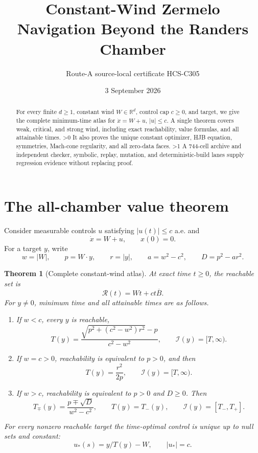 \documentclass[10pt]{article}
\title{Constant-Wind Zermelo Navigation Beyond the Randers Chamber}
\author{Route-A source-local certificate HCS-C305}
\date{3 September 2026}
\providecommand{\CRevisionRound}{2}
\newtheorem{theorem}{Theorem}
\newcommand{\R}{\mathbb R}
\newcommand{\B}{\overline B}
\begin{document}
\maketitle
\begin{abstract}
For every finite $d\ge1$, constant wind $W\in\R^d$, control cap $c\ge0$,
and target, we give the complete minimum-time atlas for
$\dot x=W+u$, $|u|\le c$. A single theorem covers weak, critical, and strong
wind, including exact reachability, value formulas, and all attainable times.
\ifnum\CRevisionRound>0
It also proves the unique constant optimizer, HJB equation, symmetries,
Mach-cone regularity, and all zero-data faces.
\fi
\ifnum\CRevisionRound>1
A 744-cell archive and independent checker, symbolic, replay, mutation, and
deterministic-build lanes supply regression evidence without replacing proof.
\fi
\end{abstract}

\section{The all-chamber value theorem}
Consider measurable controls $u$ satisfying $|u(t)|\le c$ a.e. and
\begin{equation}\label{eq:system}
 \dot x=W+u,\qquad x(0)=0.
\end{equation}
For a target $y$, write
\[
 w=|W|,\qquad p=W\cdot y,\qquad r=|y|,
 \qquad a=w^2-c^2,\qquad D=p^2-ar^2.
\]

\begin{theorem}[Complete constant-wind atlas]\label{thm:atlas}
At exact time $t\ge0$, the reachable set is
\begin{equation}\label{eq:ball}
 \mathcal R(t)=Wt+ct\B.
\end{equation}
For $y\ne0$, minimum time and all attainable times are as follows.
\begin{enumerate}
\item If $w<c$, every $y$ is reachable,
\begin{equation}\label{eq:weak}
 T(y)=\frac{\sqrt{p^2+(c^2-w^2)r^2}-p}{c^2-w^2},
 \qquad \mathcal I(y)=[T,\infty).
\end{equation}
\item If $w=c>0$, reachability is equivalent to $p>0$, and then
\begin{equation}\label{eq:critical}
 T(y)=\frac{r^2}{2p},\qquad \mathcal I(y)=[T,\infty).
\end{equation}
\item If $w>c$, reachability is equivalent to $p>0$ and $D\ge0$. Then
\begin{equation}\label{eq:strong}
 T_\mp(y)=\frac{p\mp\sqrt D}{w^2-c^2},\qquad
 T(y)=T_-(y),\qquad \mathcal I(y)=[T_-,T_+].
\end{equation}
\end{enumerate}
For every nonzero reachable target the time-optimal control is unique up to
null sets and constant:
\begin{equation}\label{eq:control}
 u_*(s)=y/T(y)-W,\qquad |u_*|=c.
\end{equation}
\end{theorem}
\end{document}
